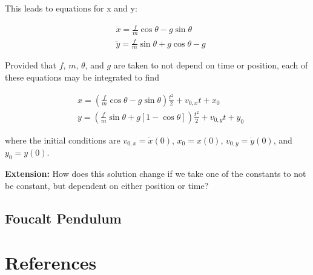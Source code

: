 \documentclass[main.tex]{subfiles}
\begin{document}
\begin{appendices}
This leads to equations for x and y:

\begin{align*}
&\ddot{x} = \frac{f}{m} \cos \theta - g \sin \theta \\
&\ddot{y} = \frac{f}{m} \sin \theta + g \cos \theta - g
\end{align*}

Provided that $f$, $m$, $\theta$, and $g$ are taken to not depend on time or position,
each of these equations may be integrated to find

\begin{align*}
& x = \left( \frac{f}{m} \cos \theta - g \sin \theta \right) \frac{t^2}{2} + v_{0,x} t
+ x_0 \\
& y = \left( \frac{f}{m} \sin \theta + g \left[ 1 - \cos \theta \right] \right) \frac{t^2}{2}
+ v_{0,y} t + y_0
\end{align*}

where the initial conditions are $v_{0,x} = \dot{x}(0)$, $x_0 = x(0)$, $v_{0,y} =
\dot{y}(0)$, and $y_0 = y(0)$.

\textbf{Extension:} How does this solution change if we take one of the constants to not be constant, but
dependent on either position or time?


\section{Foucalt Pendulum}

\chapter{References}



\end{appendices}
\end{document}
